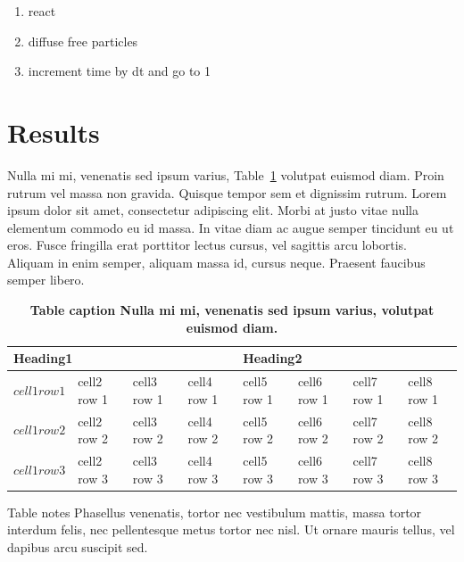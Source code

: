 \documentclass[10pt,letterpaper]{article}
\begin{document}
\begin{enumerate}
\item{react}
\item{diffuse free particles}
\item{increment time by dt and go to 1}
\end{enumerate}

\section*{Results}
Nulla mi mi, venenatis sed ipsum varius, Table~\ref{table1} volutpat euismod diam. Proin rutrum vel massa non gravida. Quisque tempor sem et dignissim rutrum. Lorem ipsum dolor sit amet, consectetur adipiscing elit. Morbi at justo vitae nulla elementum commodo eu id massa. In vitae diam ac augue semper tincidunt eu ut eros. Fusce fringilla erat porttitor lectus cursus, vel sagittis arcu lobortis. Aliquam in enim semper, aliquam massa id, cursus neque. Praesent faucibus semper libero.


\begin{table}[!ht]
\begin{adjustwidth}{-2.25in}{0in} %
\caption{
{\bf Table caption Nulla mi mi, venenatis sed ipsum varius, volutpat euismod diam.}}
\begin{tabular}{|l|l|l|l|l|l|l|l|}
\hline
\multicolumn{4}{|l|}{\bf Heading1} & \multicolumn{4}{|l|}{\bf Heading2}\\ \hline
$cell1 row1$ & cell2 row 1 & cell3 row 1 & cell4 row 1 & cell5 row 1 & cell6 row 1 & cell7 row 1 & cell8 row 1\\ \hline
$cell1 row2$ & cell2 row 2 & cell3 row 2 & cell4 row 2 & cell5 row 2 & cell6 row 2 & cell7 row 2 & cell8 row 2\\ \hline
$cell1 row3$ & cell2 row 3 & cell3 row 3 & cell4 row 3 & cell5 row 3 & cell6 row 3 & cell7 row 3 & cell8 row 3\\ \hline
\end{tabular}
\begin{flushleft} Table notes Phasellus venenatis, tortor nec vestibulum mattis, massa tortor interdum felis, nec pellentesque metus tortor nec nisl. Ut ornare mauris tellus, vel dapibus arcu suscipit sed.
\end{flushleft}
\label{table1}
\end{adjustwidth}
\end{table}
\end{document}
